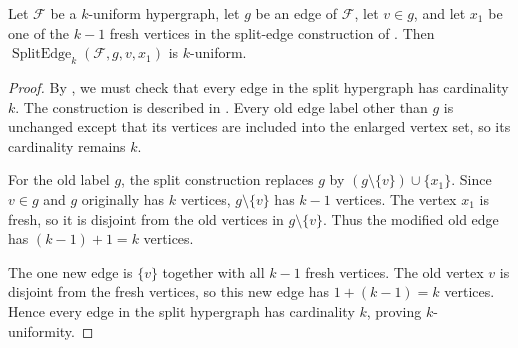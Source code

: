 \begin{helper}
Let $\mathcal F$ be a $k$-uniform hypergraph, let $g$ be an edge of
$\mathcal F$, let $v\in g$, and let $x_1$ be one of the $k-1$ fresh
vertices in the split-edge construction of
.  Then
$\operatorname{SplitEdge}_k(\mathcal F,g,v,x_1)$ is $k$-uniform.
\end{helper}
\begin{proof}
By , we must check that every edge in the
split hypergraph has cardinality $k$.  The construction is described in
.  Every old edge label other than
$g$ is unchanged except that its vertices are included into the enlarged
vertex set, so its cardinality remains $k$.

For the old label $g$, the split construction replaces $g$ by
$(g\setminus\{v\})\cup\{x_1\}$.  Since $v\in g$ and $g$ originally has
$k$ vertices, $g\setminus\{v\}$ has $k-1$ vertices.  The vertex $x_1$ is
fresh, so it is disjoint from the old vertices in $g\setminus\{v\}$.
Thus the modified old edge has $(k-1)+1=k$ vertices.

The one new edge is $\{v\}$ together with all $k-1$ fresh vertices.  The
old vertex $v$ is disjoint from the fresh vertices, so this new edge has
$1+(k-1)=k$ vertices.  Hence every edge in the split hypergraph has
cardinality $k$, proving $k$-uniformity.
\end{proof}

